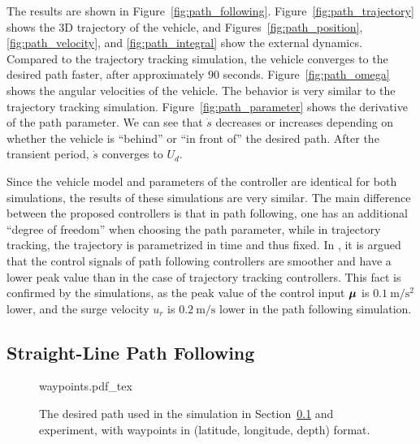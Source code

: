 The results are shown in Figure~\ref{fig:path_following}.
Figure~\ref{fig:path_trajectory} shows the 3D trajectory of the vehicle, and Figures~\ref{fig:path_position}, \ref{fig:path_velocity}, and \ref{fig:path_integral} show the external dynamics.
Compared to the trajectory tracking simulation, the vehicle converges to the desired path faster, after approximately $90$ seconds.
Figure~\ref{fig:path_omega} shows the angular velocities of the vehicle.
The behavior is very similar to the trajectory tracking simulation.
Figure~\ref{fig:path_parameter} shows the derivative of the path parameter.
We can see that $\dot{s}$ decreases or increases depending on whether the vehicle is ``behind'' or ``in front of'' the desired path.
After the transient period, $\dot{s}$ converges to $U_d$.

Since the vehicle model and parameters of the controller are identical for both simulations, the results of these simulations are very similar.
The main difference between the proposed controllers is that in path following, one has an additional ``degree of freedom'' when choosing the path parameter, while in trajectory tracking, the trajectory is parametrized in time and thus fixed.
In \cite{aguiar_trajectory_tracking_2007}, it is argued that the control signals of path following controllers are smoother and have a lower peak value than in the case of trajectory tracking controllers.
This fact is confirmed by the simulations, as the peak value of the control input $\bm{\mu}$ is $\SI{0.1}{\meter\per\second\squared}$ lower, and the surge velocity $u_r$ is $\SI{0.2}{\meter\per\second}$ lower in the path following simulation.

\subsection{Straight-Line Path Following}
\label{sec:handpos_trajectory_simulation_waypoints}

\begin{figure}[tb]
    \centering
    \def\svgwidth{0.7\textwidth}
    
    {waypoints.pdf_tex}
    \vspace*{-0.5mm}
    \caption{The desired path used in the simulation in Section~\ref{sec:handpos_trajectory_simulation_waypoints} and experiment, with waypoints in (latitude, longitude, depth) format.}
    \label{fig:waypoints}
\end{figure}



